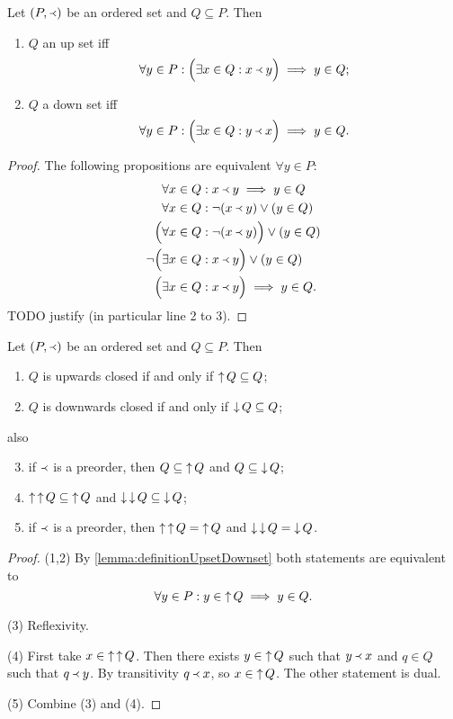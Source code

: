 \begin{lemma} \label{lemma:definitionUpsetDownset}
Let $\left( P, \Yleft \right)$ be an ordered set and $Q\subseteq P$. Then
\begin{enumerate}
\item $Q$ an up set iff 
\[ \forall y\in P: \Big(\exists x\in Q:  x\Yleft y\Big) \implies y\in Q; \]
\item $Q$ a down set iff 
\[ \forall y\in P: \Big(\exists x\in Q:  y\Yleft x\Big) \implies y\in Q. \]
\end{enumerate}
\end{lemma}
\begin{proof}
The following propositions are equivalent $\forall y\in P$:
\begin{align*}
&\forall x\in Q: x\Yleft y \implies y\in Q \\
&\forall x\in Q: \neg(x\Yleft y) \lor (y\in Q) \\
\Big(&\forall x\in Q: \neg(x\Yleft y)\Big) \lor (y\in Q) \\
\neg \Big(&\exists x\in Q: x\Yleft y \Big) \lor (y\in Q) \\
\Big(&\exists x\in Q:  x\Yleft y\Big) \implies y\in Q.
\end{align*}
TODO justify (in particular line 2 to 3).
\end{proof}

\begin{lemma} \label{lemma:QsubseteqDownQ} \label{lemma:upwardDownwardClosure}
Let $\left( P, \Yleft \right)$ be an ordered set and $Q\subseteq P$. Then
\begin{enumerate}
\item $Q$ is upwards closed \textup{if and only if} $\mathop{\uparrow} Q \subseteq Q$;
\item $Q$ is downwards closed \textup{if and only if} $\mathop{\downarrow} Q \subseteq Q$;
\end{enumerate}
also
\begin{enumerate} \setcounter{enumi}{2}
\item if $\Yleft$ is a preorder, then $Q \subseteq \mathop{\uparrow} Q$ and $Q \subseteq \mathop{\downarrow} Q$;
\item $\mathop{\uparrow}\mathop{\uparrow} Q \subseteq \mathop{\uparrow} Q$ and $\mathop{\downarrow}\mathop{\downarrow} Q \subseteq \mathop{\downarrow} Q$;
\item if $\Yleft$ is a preorder, then $\mathop{\uparrow}\mathop{\uparrow} Q = \mathop{\uparrow} Q$ and $\mathop{\downarrow}\mathop{\downarrow} Q = \mathop{\downarrow} Q$.
\end{enumerate}
\end{lemma}
\begin{proof}
(1,2) By \ref{lemma:definitionUpsetDownset} both statements are equivalent to
\[ \forall y\in P: y\in \mathop{\uparrow} Q \implies y\in Q. \]

(3) Reflexivity.

(4) First take $x\in \mathop{\uparrow}\mathop{\uparrow} Q$. Then there exists $y\in \mathop{\uparrow} Q$ such that $y\Yleft x$ and $q\in Q$ such that $q\Yleft y$. By transitivity $q \Yleft x$, so $x\in \mathop{\uparrow} Q$. The other statement is dual.

(5) Combine (3) and (4).
\end{proof}

